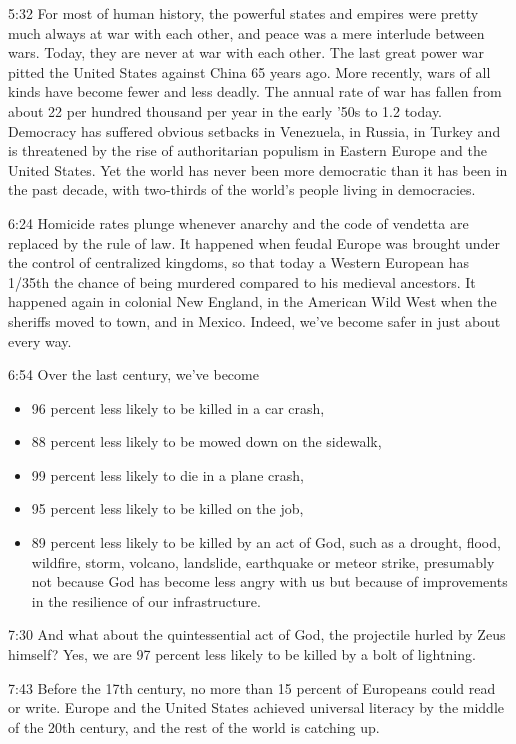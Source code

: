 \documentclass[10pt,titlepage]{article}
\begin{document}
5:32
For most of human history,
the powerful states and empires
were pretty much always at war with each other,
and peace was a mere interlude between wars.
Today, they are never at war with each other.
The last great power war
pitted the United States against China 65 years ago.
More recently, wars of all kinds have become fewer and less deadly.
The annual rate of war has fallen from about 22 per hundred thousand per year
in the early '50s to 1.2 today.
Democracy has suffered obvious setbacks
in Venezuela, in Russia, in Turkey
and is threatened by the rise of authoritarian populism
in Eastern Europe and the United States.
Yet the world has never been more democratic
than it has been in the past decade,
with two-thirds of the world's people living in democracies.

6:24
Homicide rates plunge whenever anarchy and the code of vendetta
are replaced by the rule of law.
It happened when feudal Europe was brought under the control of centralized kingdoms,
so that today a Western European
has 1/35th the chance of being murdered
compared to his medieval ancestors.
It happened again in colonial New England,
in the American Wild West when the sheriffs moved to town,
and in Mexico.
Indeed, we've become safer in just about every way.

6:54
Over the last century, we've become
\begin{itemize}
\item 96 percent less likely
to be killed in a car crash,
\item 88 percent less likely to be mowed down on the sidewalk,
\item 99 percent less likely to die in a plane crash,
\item 95 percent less likely to be killed on the job,
\item 89 percent less likely to be killed by an act of God,
such as a drought, flood, wildfire, storm, volcano,
landslide, earthquake or meteor strike,
presumably not because God has become less angry with us
but because of improvements in the resilience of our infrastructure.
\end{itemize}

7:30
And what about the quintessential act of God,
the projectile hurled by Zeus himself?
Yes, we are 97 percent less likely to be killed by a bolt of lightning.

7:43
Before the 17th century,
no more than 15 percent of Europeans could read or write.
Europe and the United States achieved universal literacy
by the middle of the 20th century,
and the rest of the world is catching up.
\end{document}
